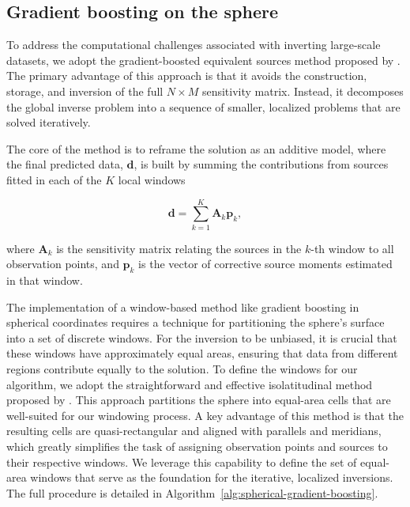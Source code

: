 \subsection{Gradient boosting on the sphere}

To address the computational challenges associated with inverting large-scale datasets, we adopt the
gradient-boosted equivalent sources method proposed by \citet{Soler2021}. The primary advantage of
this approach is that it avoids the construction, storage, and inversion of the full $N \times M$
sensitivity matrix. Instead, it decomposes the global inverse problem into a sequence of smaller,
localized problems that are solved iteratively.

The core of the method is to reframe the solution as an additive model, where the final predicted
data, $\mathbf{d}$, is built by summing the contributions from sources fitted in each of the $K$
local windows

\begin{equation}
    \mathbf{d} = \sum_{k=1}^{K} \mathbf{A}_k \mathbf{p}_k,
\end{equation}

\noindent
where $\mathbf{A}_k$ is the sensitivity matrix relating the sources in the $k$-th window to all
observation points, and $\mathbf{p}_k$ is the vector of corrective source moments estimated in that
window.

The implementation of a window-based method like gradient boosting in spherical coordinates requires
a technique for partitioning the sphere's surface into a set of discrete windows. For the inversion
to be unbiased, it is crucial that these windows have approximately equal areas, ensuring that data
from different regions contribute equally to the solution. To define the windows for our algorithm,
we adopt the straightforward and effective isolatitudinal method proposed by \citet{Malkin2016}.
This approach partitions the sphere into equal-area cells that are well-suited for our windowing process.
A key advantage of this method is that the resulting cells are quasi-rectangular and aligned with parallels
and meridians, which greatly simplifies the task of assigning observation points and sources to
their respective windows. We leverage this capability to define the set of equal-area windows that
serve as the foundation for the iterative, localized inversions. The full procedure is detailed in
Algorithm~\ref{alg:spherical-gradient-boosting}.

